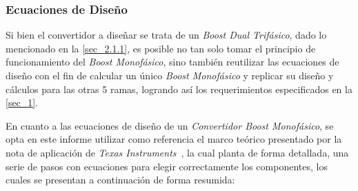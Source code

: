 \documentclass[12pt,a4paper]{article}
\begin{document}
\subsubsection{Ecuaciones de Diseño}                                        \label{sec_2.1.2}
Si bien el convertidor a diseñar se trata de un \textit{Boost Dual Trifásico}, dado lo mencionado en la \autoref{sec_2.1.1}, es posible no tan solo tomar el principio de funcionamiento del \textit{Boost Monofásico}, sino también reutilizar las ecuaciones de diseño con el fin de calcular un único \textit{Boost Monofásico} y replicar su diseño y cálculos para las otras 5 ramas, logrando así los requerimientos especificados en la \autoref{sec_1}.

En cuanto a las ecuaciones de diseño de un \textit{Convertidor Boost Monofásico}, se opta en este informe utilizar como referencia el marco teórico presentado por la nota de aplicación de \textit{Texas Instruments}~\cite{b5}, la cual planta de forma detallada, una serie de pasos con ecuaciones para elegir correctamente los componentes, los cuales se presentan a continuación de forma resumida:
\end{document}
